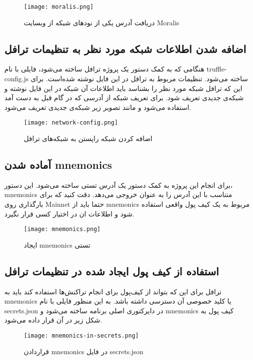 \begin{figure}[ht]
\centerline{\texttt{[image: moralis.png]}}
\caption{دریافت آدرس یکی از نود‌های شبکه از وبسایت Moralis}
\label{fig:moralis}
\end{figure}

\subsection{اضافه شدن اطلاعات شبکه مورد نظر به تنظیمات ترافل}
هنگامی که به کمک دستور
یک پروژه ترافل ساخته می‌شود، فایلی با نام truffle-config.js ساخته می‌شود. تنظیمات مربوط به ترافل در این فایل نوشته شده‌است. برای این که ترافل شبکه مورد نظر را بشناسد باید اطلاعات آن شبکه در این فایل نوشته و شبکه‌ی جدیدی تعریف شود. برای تعریف شبکه از آدرسی که در گام قبل به دست آمد استفاده می‌شود و مانند تصویر زیر شبکه‌ی جدیدی تعریف می‌شود.

\begin{figure}[ht]
\centerline{\texttt{[image: network-config.png]}}
\caption{اضافه کردن شبکه راپستن به شبکه‌های ترافل}
\label{fig:network-config}
\end{figure}


\subsection{آماده شدن mnemonics}
برای انجام این پروژه به کمک دستور
یک آدرس تستی ساخته می‌شود. این دستور، mnemonics متناسب با این آدرس را به عنوان خروجی می‌دهد. دقت کنید که برای بارگذاری روی
\gls{Mainnet}
حتما باید از mnemonics مربوط به یک کیف پول واقعی استفاده شود و اطلاعات ان در اختیار کسی قرار نگیرد.

\begin{figure}[ht]
\centerline{\texttt{[image: mnemonics.png]}}
\caption{ایجاد mnemonics تستی}
\label{fig:mnemonics}
\end{figure}


\subsection{استفاده از کیف پول ایجاد شده در تنظیمات ترافل}
ترافل برای این که بتواند از کیف‌پول برای انجام تراکنش‌ها استفاده کند باید به mnemonics یا کلید خصوصی آن دسترسی داشته باشد. به این منظور فایلی با نام secrets.json در دایرکتوری اصلی برنامه ساخته می‌شود و mnemonics کیف پول به شکل زیر در آن قرار داده می‌شود.

\begin{figure}[ht]
\centerline{\texttt{[image: mnemonics-in-secrets.png]}}
\caption{قراردادن mnemonics در فایل secrets.json}
\label{fig:mnemonics-in-secrets}
\end{figure}

